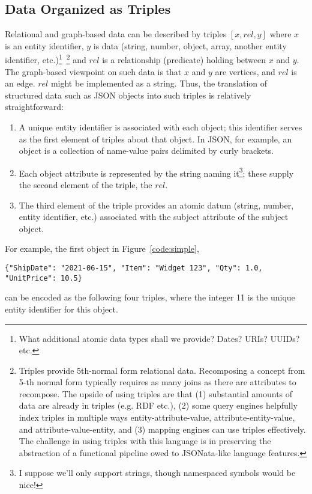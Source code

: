 \documentclass[9pt,letterpaper]{article}
\newcommand{\stt}[1]{\begin{footnotesize}\texttt{#1}\end{footnotesize}}
\begin{document}
\subsection{Data Organized as Triples}
Relational and graph-based data can be described by triples $[x,rel,y]$ where $x$ is an entity identifier, $y$ is data (string, number, object, array, another entity identifier, etc.)\footnote{What  additional atomic data
  types shall we provide? Dates? URIs? UUIDs? etc.}~\footnote{Triples provide 5th-normal form relational data. Recomposing a concept from 5-th normal form typically requires as many joins as
  there are attributes to recompose.
  The upside of using triples are that
  (1) substantial amounts of data are already in triples (e.g. RDF etc.),
  (2) some query engines helpfully index triples in multiple ways entity-attribute-value, attribute-entity-value, and attribute-value-entity, and
  (3) mapping engines can use triples effectively.
  The challenge in using triples with this language is in preserving the abstraction of a functional pipeline owed to JSONata-like language features.}
and $rel$ is a relationship (predicate) holding between $x$ and $y$.
The graph-based viewpoint on such data is that $x$ and $y$ are vertices, and $rel$ is an edge.
$rel$ might be implemented as a string.
Thus, the translation of structured data such as JSON objects into such triples is relatively straightforward:
\begin{enumerate}
\item A unique entity identifier is associated with each object; this identifier serves as the first element of triples about that object.
      In JSON, for example, an object is a collection of name-value pairs delimited by curly brackets.
\item Each object attribute is represented by the string naming it\footnote{I suppose we'll only support strings, though namespaced symbols would be nice!}; these supply the second element of the triple, the $rel$.
\item The third element of the triple provides an atomic datum (string, number, entity identifier, etc.) associated with the subject attribute of the subject object.
\end{enumerate}

For example, the first object in Figure~\ref{code:simple}, \stt{\{"ShipDate":  "2021-06-15", "Item":  "Widget 123", "Qty": 1.0, "UnitPrice": 10.5\}} can be encoded as
the following four triples, where the integer 11 is the unique entity identifier for this object.
\end{document}
